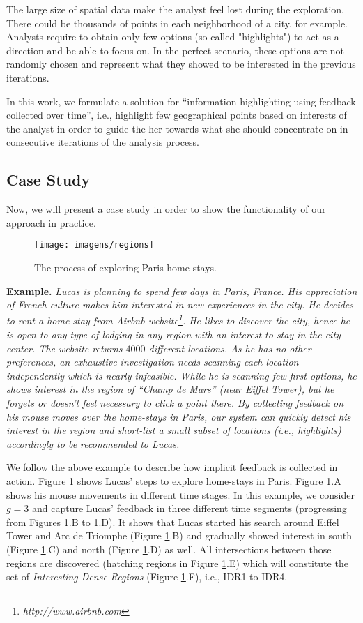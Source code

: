 The large size of spatial data make the analyst feel lost during the exploration. There could be thousands of points in each neighborhood of a city, for example. Analysts require to obtain only few options (so-called "highlights") to act as a direction and be able to focus on. In the perfect scenario, these options are not randomly chosen and represent what they showed to be interested in the previous iterations.

In this work, we formulate a solution for ``information highlighting using feedback collected over time'', i.e., highlight few geographical points based on interests of the analyst in order to guide the her towards what she should concentrate on in consecutive iterations of the analysis process.

\subsection{Case Study}

Now, we will present a case study in order to show the functionality of our approach in practice.

\begin{figure}[t]
	\centering
	\texttt{[image: imagens/regions]}
	\caption{The process of exploring Paris home-stays.}
	\label{fig:regions}
\end{figure}

{\bf Example.} {\em Lucas is planning to spend few days in Paris, France. His appreciation of French culture makes him interested in new experiences in the city. He decides to rent a home-stay from Airbnb website\footnote{\it http://www.airbnb.com}. He likes to discover the city, hence he is open to any type of lodging in any region with an interest to stay in the city center. The website returns $4000$ different locations. As he has no other preferences, an exhaustive investigation needs scanning each location independently which is nearly infeasible. While he is scanning few first options, he shows interest in the region of ``Champ de Mars'' (near Eiffel Tower), but he forgets or doesn't feel necessary to click a point there. By collecting feedback on his mouse moves over the home-stays in Paris, our system can quickly detect his interest in the region and short-list a small subset of locations (i.e., highlights) accordingly to be recommended to Lucas.}

We follow the above example to describe how implicit feedback is collected in action. Figure \ref{fig:regions} shows Lucas' steps to explore home-stays in Paris. Figure \ref{fig:regions}.A shows his mouse movements in different time stages. In this example, we consider $g = 3$ and capture Lucas' feedback in three different time segments (progressing from Figures \ref{fig:regions}.B to \ref{fig:regions}.D). It shows that Lucas started his search around Eiffel Tower and Arc de Triomphe (Figure \ref{fig:regions}.B) and gradually showed interest in south (Figure \ref{fig:regions}.C) and north (Figure \ref{fig:regions}.D) as well. All intersections between those regions are discovered (hatching regions in Figure \ref{fig:regions}.E) which will constitute the set of {\em Interesting Dense Regions} (Figure \ref{fig:regions}.F), i.e., IDR1 to IDR4.


